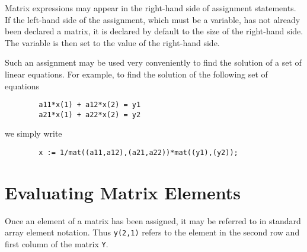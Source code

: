 Matrix expressions may appear in the right-hand side of assignment
statements. If the left-hand side of the assignment, which must be a
variable, has not already been declared a matrix, it is declared by default
to the size of the right-hand side. The variable is then set to the value
of the right-hand side.

Such an assignment may be used very conveniently to find the solution of a
set of linear equations. For example, to find the solution of the
following set of equations
\begin{verbatim}
        a11*x(1) + a12*x(2) = y1
        a21*x(1) + a22*x(2) = y2
\end{verbatim}
we simply write
\begin{verbatim}
        x := 1/mat((a11,a12),(a21,a22))*mat((y1),(y2));
\end{verbatim}

\section{Evaluating Matrix Elements}

Once an element of a matrix has been assigned, it may be referred to in
standard array element notation.  Thus \texttt{y(2,1)} refers to the element
in the second row and first column of the matrix \texttt{Y}.

